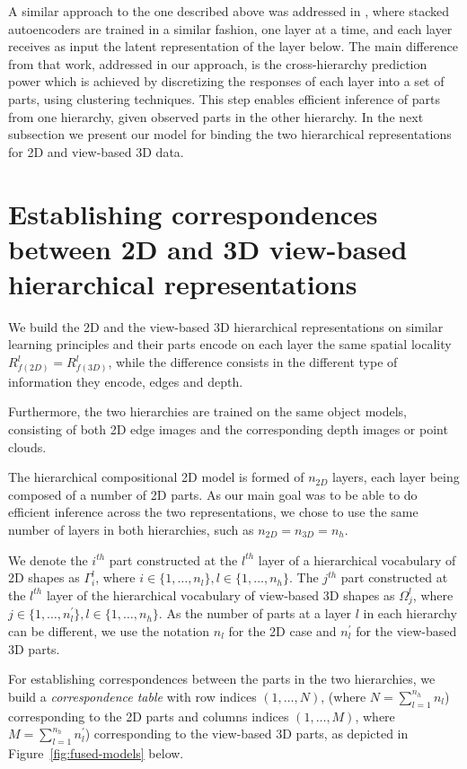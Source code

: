 \documentclass[runningheads]{llncs}
\begin{document}
A similar approach to the one described above was addressed in \cite{Masci2011}, where stacked autoencoders are trained in a similar fashion, one layer at a time, and each layer receives as input the latent representation of the layer below. The main difference from that work, addressed in our approach, is the cross-hierarchy prediction power which is achieved by discretizing the responses of each layer into a set of parts, using clustering techniques. This step enables efficient inference of parts from one hierarchy, given observed parts in the other hierarchy. In the next subsection we present our model for binding the two hierarchical representations for 2D and view-based 3D data.
 
\section{Establishing correspondences between 2D and 3D view-based hierarchical representations}
\label{sec:analysis}

We build the 2D and the view-based 3D hierarchical representations on similar learning principles and their parts encode on each layer the same spatial locality $R_{f(2D)}^l=R_{f(3D)}^l$, while the difference consists in the different type of information they encode, edges and depth.
	
Furthermore, the two hierarchies are trained on the same object models, consisting of both 2D edge images and the corresponding depth images or point clouds.  

The hierarchical compositional 2D model is formed of $n_{2D}$ layers, each layer being composed of a number of 2D parts. 
As our main goal was to be able to do efficient inference across the two representations, we chose to use the same number of layers in both hierarchies, such as $n_{2D}=n_{3D}=n_h$.

We denote the $i^{th}$ part constructed at the $l^{th}$ layer of a  hierarchical vocabulary of 2D shapes as $\Gamma_{i}^{l}$, where $i \in \{1,\ldots,n_{l}\}, l \in \{1,\ldots,n_h\}$. The $j^{th}$ part constructed at the $l^{th}$ layer of the  hierarchical vocabulary of view-based 3D shapes as $\Omega_{j}^{l}$, where $j \in \{1,\ldots,n_{l}^{'}\}, {l} \in \{1,\ldots,n_h\}$. As the number of parts at a layer $l$ in each hierarchy can be different, we use the notation $n_l$ for the 2D case and $n_l^{'}$ for the view-based 3D parts. 

For establishing correspondences between the parts in the two hierarchies, we build a \emph{correspondence table} with row indices $(1,\dots,N)$, (where $N=\sum_{l=1}^{n_h} {n_l}$) corresponding to the 2D parts and columns indices $(1,\dots,M)$, where $M=\sum_{l=1}^{n_h} {n_{l}^ {'}}$) corresponding to the view-based 3D parts, as depicted in Figure~\ref{fig:fused-models} below. 
\end{document}
